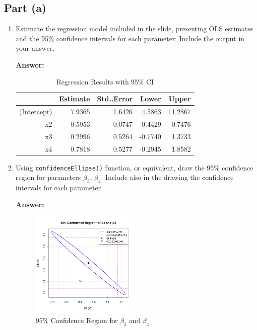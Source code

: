 \documentclass[12pt,a4paper]{article}
\begin{document}
\subsection*{Part (a)}
\begin{enumerate}[label=(\roman*)]
  \item Estimate the regression model included in the slide, presenting OLS estimates and the 95\% confidence intervals for each parameter; Include the output in your answer.
  
  \textbf{Answer:} 
 
\begin{table}[ht]
    \centering
    \caption{Regression Results with 95\% CI} 
    \label{tab:regression}
  \begin{tabular}{rrrrr}
    \hline
    & Estimate & Std..Error & Lower & Upper \\ 
    \hline
    (Intercept) & 7.9365 & 1.6426 & 4.5863 & 11.2867 \\ 
    x2 & 0.5953 & 0.0747 & 0.4429 & 0.7476 \\ 
    x3 & 0.2996 & 0.5264 & -0.7740 & 1.3733 \\ 
    x4 & 0.7818 & 0.5277 & -0.2945 & 1.8582 \\ 
    \hline
  \end{tabular}
\end{table}

  
  \item Using \texttt{confidenceEllipse()} function, or equivalent, draw the 95\% confidence region for parameters $\beta_3$, $\beta_4$. Include also in the drawing the confidence intervals for each parameter.
  
  \textbf{Answer:} 

    \begin{figure}[H]  %
      \centering
      \includegraphics[width=0.5\textwidth]{Files/q1ii_plot.png}
      \caption{95\% Confidence Region for $\beta_3$ and $\beta_4$}
      \label{fig:ellipse}
    \end{figure}


\end{enumerate}
\end{document}

